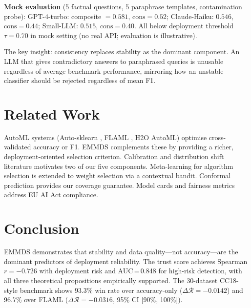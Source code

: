 \documentclass[10pt]{article}
\newcommand{\EMMDS}{\textsc{EMMDS}}
\newcommand{\risk}{\mathcal{R}}
\begin{document}
\textbf{Mock evaluation} (5 factual questions, 5 paraphrase templates, contamination probe): GPT-4-turbo: composite $= 0.581$, $\text{cons}{=}0.52$; Claude-Haiku: $0.546$, $\text{cons}{=}0.44$; Small-LLM: $0.515$, $\text{cons}{=}0.40$. All below deployment threshold $\tau{=}0.70$ in mock setting (no real API; evaluation is illustrative).

The key insight: consistency replaces stability as the dominant component. An LLM that gives contradictory answers to paraphrased queries is unusable regardless of average benchmark performance, mirroring how an unstable classifier should be rejected regardless of mean F1.

\section{Related Work}
\label{sec:related}

AutoML systems (Auto-sklearn \citep{feurer2015efficient}, FLAML \citep{wang2021flaml}, H2O AutoML) optimise cross-validated accuracy or F1. EMMDS complements these by providing a richer, deployment-oriented selection criterion. Calibration \citep{guo2017calibration} and distribution shift \citep{quinonero2009dataset} literature motivates two of our five components. Meta-learning for algorithm selection \citep{vanschoren2018meta} is extended to weight selection via a contextual bandit. Conformal prediction \citep{angelopoulos2022gentle} provides our coverage guarantee. Model cards \citep{mitchell2019model} and fairness metrics \citep{hardt2016equality} address EU AI Act compliance.

\section{Conclusion}
\label{sec:conclusion}

\EMMDS{} demonstrates that stability and data quality—not accuracy—are the dominant predictors of deployment reliability. The trust score achieves Spearman $r{=}{-}0.726$ with deployment risk and AUC\,=\,0.848 for high-risk detection, with all three theoretical propositions empirically supported. The 30-dataset CC18-style benchmark shows 93.3\% win rate over accuracy-only ($\Delta\risk = -0.0142$) and 96.7\% over FLAML ($\Delta\risk = -0.0316$, 95\% CI [90\%, 100\%]).
\end{document}
